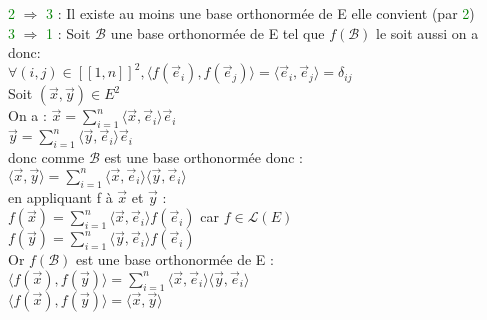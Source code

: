 \documentclass{article}
\begin{document}
\textcolor{green}{2} $\Rightarrow$ \textcolor{green}{3} : Il existe au moins une base orthonormée de E elle convient (par \textcolor{green}{2}) \\
\textcolor{green}{3} $\Rightarrow$ \textcolor{green}{1} : Soit $\mathcal B$ une base orthonormée de E tel que $f (\mathcal B)$ le soit aussi on a donc: \\
$\forall(i,j) \in [[1,n]]^2, \langle f(\vec e_i),f(\vec e_j) \rangle = \langle \vec e_i, \vec e_j \rangle =\delta_{ij}$ \\
Soit $(\vec x, \vec y) \in E^2$ \\
On a : $\vec x= \sum_{i=1}^n \langle \vec x, \vec e_i \rangle \vec e_i$ \\
$\vec y= \sum_{i=1}^n \langle \vec y, \vec e_i \rangle  \vec e_i$ \\
donc comme $\mathcal B$ est une base orthonormée donc : \\
$\langle \vec x, \vec y \rangle= \sum_{i=1}^n \langle \vec x, \vec e_i \rangle \langle \vec y, \vec e_i \rangle$ \\
en appliquant f à $\vec x$ et $\vec y$ : \\
$f(\vec x)=\sum_{i=1}^n \langle \vec x, \vec e_i \rangle f(\vec e_i)$ car $f\in \mathcal L(E)$ \\
$f(\vec y)= \sum_{i=1}^n \langle \vec y, \vec e_i \rangle f(\vec e_i)$ \\
Or $f(\mathcal B)$ est une base orthonormée de E : \\
$\langle f(\vec x), f(\vec y) \rangle = \sum_{i=1}^n \langle \vec x, \vec e_i \rangle \langle \vec y, \vec e_i \rangle$ \\
$\langle f(\vec x), f(\vec y) \rangle =\langle \vec x,\vec y \rangle $
\end{document}
